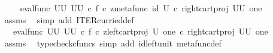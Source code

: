 \begin{isabellebody}
\ \isamarkupfalse%
\ {\isachardoublequoteopen}{\isachardot}{\kern0pt}{\isachardot}{\kern0pt}{\isachardot}{\kern0pt}\ {\isacharequal}{\kern0pt}\ {\isacharparenleft}{\kern0pt}eval{\isacharunderscore}{\kern0pt}func\ {\isacharparenleft}{\kern0pt}U\isactrlbsup U\isactrlesup {\isacharparenright}{\kern0pt}\ {\isacharparenleft}{\kern0pt}U\isactrlbsup U\isactrlesup {\isacharparenright}{\kern0pt}{\isacharparenright}{\kern0pt}\ {\isasymcirc}\isactrlsub c\ {\isasymlangle}f\ {\isasymcirc}\isactrlsub c\ z{\isacharcomma}{\kern0pt}{\isacharparenleft}{\kern0pt}metafunc\ {\isacharparenleft}{\kern0pt}id\ U{\isacharparenright}{\kern0pt}\ {\isasymcirc}\isactrlsub c\ {\isacharparenleft}{\kern0pt}right{\isacharunderscore}{\kern0pt}cart{\isacharunderscore}{\kern0pt}proj\ {\isacharparenleft}{\kern0pt}U\isactrlbsup U\isactrlesup {\isacharparenright}{\kern0pt}\ one{\isacharparenright}{\kern0pt}{\isacharparenright}{\kern0pt}\isactrlsup {\isasymsharp}{\isasymrangle}{\isachardoublequoteclose}\isanewline
\ \ \ \ \isamarkupfalse%
\ assms\ \isamarkupfalse%
\ {\isacharparenleft}{\kern0pt}simp\ add{\isacharcolon}{\kern0pt}\ ITER{\isacharunderscore}{\kern0pt}curried{\isacharunderscore}{\kern0pt}def{}{\isacharparenright}{\kern0pt}\ \ \ \isanewline
\ \ \isamarkupfalse%
\ \isamarkupfalse%
\ {\isachardoublequoteopen}{\isachardot}{\kern0pt}{\isachardot}{\kern0pt}{\isachardot}{\kern0pt}\ {\isacharequal}{\kern0pt}\ {\isacharparenleft}{\kern0pt}eval{\isacharunderscore}{\kern0pt}func\ {\isacharparenleft}{\kern0pt}U\isactrlbsup U\isactrlesup {\isacharparenright}{\kern0pt}\ {\isacharparenleft}{\kern0pt}U\isactrlbsup U\isactrlesup {\isacharparenright}{\kern0pt}{\isacharparenright}{\kern0pt}\ {\isasymcirc}\isactrlsub c\ {\isasymlangle}f\ {\isasymcirc}\isactrlsub c\ z{\isacharcomma}{\kern0pt}{\isacharparenleft}{\kern0pt}{\isacharparenleft}{\kern0pt}left{\isacharunderscore}{\kern0pt}cart{\isacharunderscore}{\kern0pt}proj\ {\isacharparenleft}{\kern0pt}U{\isacharparenright}{\kern0pt}\ one{\isacharparenright}{\kern0pt}\isactrlsup {\isasymsharp}\ {\isasymcirc}\isactrlsub c\ {\isacharparenleft}{\kern0pt}right{\isacharunderscore}{\kern0pt}cart{\isacharunderscore}{\kern0pt}proj\ {\isacharparenleft}{\kern0pt}U\isactrlbsup U\isactrlesup {\isacharparenright}{\kern0pt}\ one{\isacharparenright}{\kern0pt}{\isacharparenright}{\kern0pt}\isactrlsup {\isasymsharp}{\isasymrangle}{\isachardoublequoteclose}\isanewline
\ \ \ \ \isamarkupfalse%
\ assms\ \isamarkupfalse%
\ {\isacharparenleft}{\kern0pt}typecheck{\isacharunderscore}{\kern0pt}cfuncs{\isacharcomma}{\kern0pt}\ simp\ add{\isacharcolon}{\kern0pt}\ id{\isacharunderscore}{\kern0pt}left{\isacharunderscore}{\kern0pt}unit{}\ metafunc{\isacharunderscore}{\kern0pt}def{}{\isacharparenright}{\kern0pt}\isanewline

\end{isabellebody}
